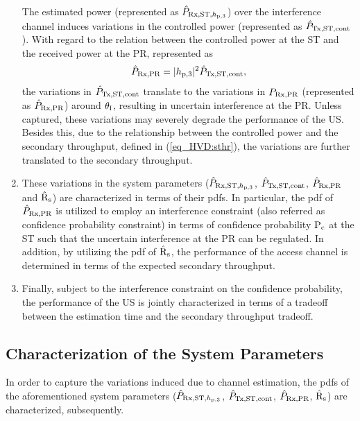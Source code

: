 \begin{enumerate}
	The estimated power (represented as $\hat{P}_{\text{Rx,ST,$h_{\text{p,3}}$}}$) over the interference channel induces variations in the controlled power (represented as $\hat{P}_{\text{Tx,ST,cont}}$). With regard to the relation between the controlled power at the ST and the received power at the PR, represented as 
\begin{align}
\hat{P}_{\text{Rx,PR}}  = |h_{\text{p,3}}|^2 \hat{P}_{\text{Tx,ST,cont}},
\label{eq_HVD:eprcvdpr}
\end{align}
the variations in $\hat{P}_{\text{Tx,ST,cont}}$ translate to the variations in $P_{\text{Rx,PR}}$ (represented as $\hat{P}_{\text{Rx,PR}}$) around $\theta_{\text{I}}$, resulting in uncertain interference at the PR. Unless captured, these variations may severely degrade the performance of the US. Besides this, due to the relationship between the controlled power and the secondary throughput, defined in (\ref{eq_HVD:sthr}), the variations are further translated to the secondary throughput. 
\item These variations in the system parameters ($\hat{P}_{\text{Rx,ST,$h_{\text{p,3}}$}}$, $\hat{P}_{\text{Tx,ST,cont}}$, $\hat{P}_{\text{Rx,PR}}$ and $\hat{\text{{R}}}_{\text{s}}$) are characterized in terms of their pdfs. In particular, the pdf of $\hat{P}_{\text{Rx,PR}}$ is utilized to employ an interference constraint (also referred as confidence probability constraint) in terms of confidence probability $\text{P}_{\text{c}}$ at the ST such that the uncertain interference at the PR can be regulated. In addition, by utilizing the pdf of $\hat{\text{{R}}}_{\text{s}}$, the performance of the access channel is determined in terms of the expected secondary throughput. \item Finally, subject to the interference constraint on the confidence probability, the performance of the US is jointly characterized in terms of a tradeoff between the estimation time and the secondary throughput tradeoff. 
\end{enumerate}

\subsection{Characterization of the System Parameters}
In order to capture the variations induced due to channel estimation, the pdfs of the aforementioned system parameters ($\hat{P}_{\text{Rx,ST,$h_{\text{p,3}}$}}$, $\hat{P}_{\text{Tx,ST,cont}}$, $\hat{P}_{\text{Rx,PR}}$, $\hat{\text{{R}}}_{\text{s}}$) are characterized, subsequently. 


